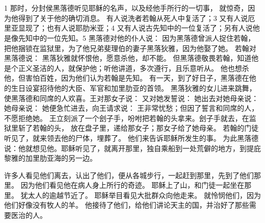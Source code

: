 \section{}

1 那时，分封侯黑落德听见耶稣的名声，以及经他手所行的一切事， 就惊奇，因为他得到了关于他的确切消息。 有人说洗者若翰从死人中复活了；\newline{}3 又有人说厄里亚显现了；也有人说耶肋米亚；\newline{}4 又有人说古先知中的一位复活了；另有人说他是像先知中的一位先知。\newline{}5 黑落德对他的仆人说： 因为黑落德曾派人捉住若翰，把他捆锁在监狱里，为了他兄弟斐理伯的妻子黑落狄雅，因为他娶了她。 若翰对黑落德说： 黑落狄雅就怀恨他，愿意杀他，却不能。 但黑落德敬畏若翰，知道他是个正义圣洁的人，就保护他；听他讲道，多次遵行，且乐意听从。 他也想杀他，但害怕百姓，因为他们认为若翰是先知。 有一天，到了好日子，黑落德在他的生日设宴招待他的大臣、军官和加里肋亚的首领。 黑落狄雅的女儿进来跳舞，使黑落德和同席的人欢喜。王对那女子说： 又对她发誓说： 她出去对她母亲说：她母亲说： 她便急忙进去，向王请求说： 王非常忧愁；但因了誓言和同席的人，不愿拒绝她。 王立刻派了一个刽子手，吩咐把若翰的头拿来。刽子手就去，在监狱里斩了若翰的头， 放在盘子里，递给那女子；那女子给了她母亲。 若翰的门徒听见了，就来领去他的尸体，埋葬了。 他们来告诉耶稣所发生的事。 为此黑落德说：他就想见他。耶稣听见了，就离开那里，独自乘船到一处荒僻的地方，到提庇黎雅的加里肋亚海的另一边。\par

 许多人看见他们离去，认出了他们，便从各城步行，一起赶到那里，先到了他们那里。 因为他们看见他在病人身上所行的奇迹。 耶稣上了山，和门徒一起坐在那里。 犹太人的逾越节近了。 耶稣举目看见大批群众向他走来。 就怜悯他们，因为他们好像没有牧人的羊。 他接待了他们，给他们讲论天主的国，并治好了那些需要医治的人。\par

